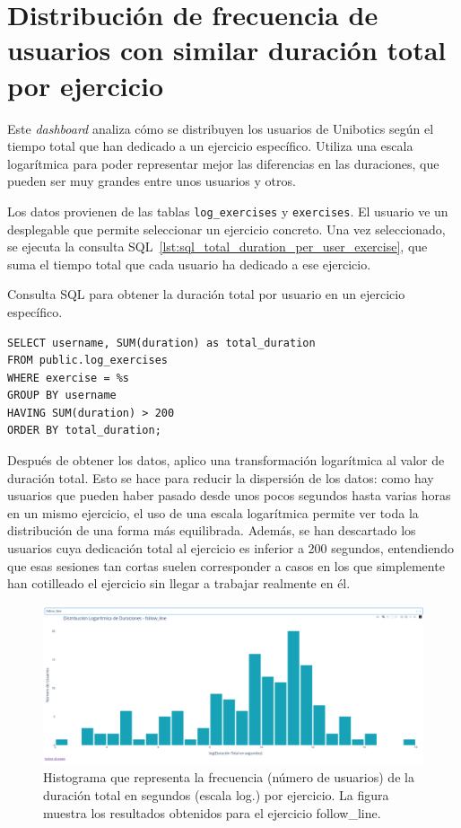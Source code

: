 \documentclass[a4paper, 12pt]{book}
\begin{document}
\section{Distribución de frecuencia de usuarios con similar duración total por ejercicio}
\label{sec:dash3a}

Este \textit{dashboard} analiza cómo se distribuyen los usuarios de Unibotics según el tiempo total que han dedicado a un ejercicio específico. Utiliza una escala logarítmica para poder representar mejor las diferencias en las duraciones, que pueden ser muy grandes entre unos usuarios y otros.

Los datos provienen de las tablas \texttt{log\_exercises} y \texttt{exercises}. El usuario ve un desplegable que permite seleccionar un ejercicio concreto. Una vez seleccionado, se ejecuta la consulta SQL~\ref{lst:sql_total_duration_per_user_exercise}, que suma el tiempo total que cada usuario ha dedicado a ese ejercicio.

\begin{listing}[h!]
\caption{Consulta SQL para obtener la duración total por usuario en un ejercicio específico.}
\label{lst:sql_total_duration_per_user_exercise}
\begin{verbatim}
SELECT username, SUM(duration) as total_duration
FROM public.log_exercises
WHERE exercise = %s
GROUP BY username
HAVING SUM(duration) > 200
ORDER BY total_duration;
\end{verbatim}
\end{listing}

Después de obtener los datos, aplico una transformación logarítmica al valor de duración total. Esto se hace para reducir la dispersión de los datos: como hay usuarios que pueden haber pasado desde unos pocos segundos hasta varias horas en un mismo ejercicio, el uso de una escala logarítmica permite ver toda la distribución de una forma más equilibrada. Además, se han descartado los usuarios cuya dedicación total al ejercicio es inferior a 200 segundos, entendiendo que esas sesiones tan cortas suelen corresponder a casos en los que simplemente han cotilleado el ejercicio sin llegar a trabajar realmente en él.


\begin{figure}[H]
  \centering
  \includegraphics[width=1.1\textwidth]{img/3a.png}
  \caption{Histograma que representa la frecuencia (número de usuarios) de la duración total en segundos (escala log.) por ejercicio. La figura muestra los resultados obtenidos para el ejercicio follow\_line.}
  \label{fig:3a}
\end{figure}
\end{document}
